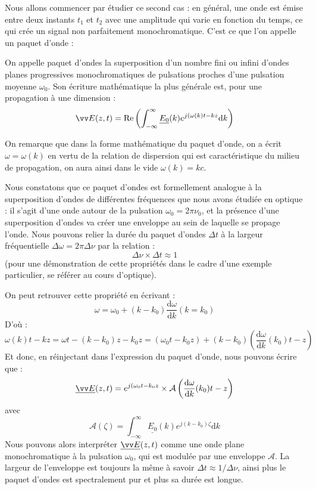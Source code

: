 \documentclass[11pt,fleqn]{book} %
\newcommand{\dd}{\mathrm{d}}
\begin{document}
Nous allons commencer par étudier ce second cas : en général, une onde est émise entre deux instants $t_1$ et $t_2$ avec une amplitude qui varie en fonction du temps, ce qui crée un signal non parfaitement monochromatique. C'est ce que l'on appelle un paquet d'onde :
\begin{definition}
	On appelle paquet d'ondes la superposition d'un nombre fini ou infini d'ondes planes progressives monochromatiques de pulsations proches d'une pulsation moyenne $\omega_0$. Son écriture mathématique la plus générale est, pour une propagation à une dimension :
	\begin{equation}
		\vv E(z,t) = \Re \left( \int_{-\infty}^{\infty} \underline{E_0}(k) e^{j(\omega(k) t - k z} \dd k \right)
	\end{equation}
\end{definition}
On remarque que dans la forme mathématique du paquet d'onde, on a écrit $\omega = \omega(k)$ en vertu de la relation de dispersion qui est caractéristique du milieu de propagation, on aura ainsi dans le vide $\omega(k) = k c$. 

Nous constatons que ce paquet d'ondes est formellement analogue à la superposition d'ondes de différentes fréquences que nous avons étudiée en optique : il s'agit d'une onde autour de la pulsation $\omega_0 = 2 \pi \nu_0$, et la présence d'une superposition d'ondes va créer une enveloppe au sein de laquelle se propage l'onde. Nous pouvons relier la durée du paquet d'ondes $\Delta t$ à la largeur fréquentielle $\Delta \omega = 2 \pi \Delta \nu$ par la relation :
\begin{equation}
	\Delta \nu \times \Delta t \approx 1
\end{equation}
(pour une démonstration de cette propriétés dans le cadre d'une exemple particulier, se référer au cours d'optique).

On peut retrouver cette propriété en écrivant :
\begin{equation}
	\omega = \omega_0 + (k-k_0) \frac{\dd \omega}{\dd k}(k=k_0)
\end{equation}
D'où :
\begin{equation}
	\omega(k) t - k z = \omega t - (k-k_0)z - k_0 z = (\omega_0 t - k_0 z) + (k-k_0) \left(\frac{\dd \omega}{\dd k}(k_0) t - z \right)
\end{equation}
Et donc, en réinjectant dans l'expression du paquet d'onde, nous pouvons écrire que :
\begin{equation}
	\underline{\vv E}(z,t) = e^{j(\omega_0 t - k_0 z} \times \mathcal{A}\left(\frac{\dd \omega}{\dd k}(k_0) t - z \right)
\end{equation}
avec
\begin{equation}
	\mathcal{A}(\zeta) = \int_{-\infty}^{\infty} \underline{E_0}(k) e^{j(k-k_0)\zeta}\dd k
\end{equation}
Nous pouvons alors interpréter $\underline{\vv E}(z,t)$ comme une onde plane monochromatique à la pulsation $\omega_0$, qui est modulée par une enveloppe $\mathcal{A}$. La largeur de l'enveloppe est toujours la même à savoir $\Delta t \approx 1/\Delta \nu$, ainsi plus le paquet d'ondes est spectralement pur et plus sa durée est longue.
\end{document}
